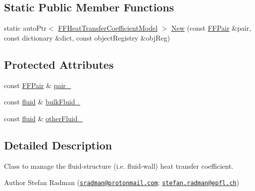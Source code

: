 \subsection*{Static Public Member Functions}
\begin{DoxyCompactItemize}
\item 
static auto\+Ptr$<$ \hyperlink{classFoam_1_1FFHeatTransferCoefficientModel}{F\+F\+Heat\+Transfer\+Coefficient\+Model} $>$ \hyperlink{classFoam_1_1FFHeatTransferCoefficientModel_ac917369d96e721a596cc42707f50dd0a}{New} (const \hyperlink{classFoam_1_1FFPair}{F\+F\+Pair} \&pair, const dictionary \&dict, const object\+Registry \&obj\+Reg)
\end{DoxyCompactItemize}
\subsection*{Protected Attributes}
\begin{DoxyCompactItemize}
\item 
const \hyperlink{classFoam_1_1FFPair}{F\+F\+Pair} \& \hyperlink{classFoam_1_1FFHeatTransferCoefficientModel_ad015e769561f394d7c717d4356dcded4}{pair\+\_\+}
\item 
const \hyperlink{classFoam_1_1fluid}{fluid} \& \hyperlink{classFoam_1_1FFHeatTransferCoefficientModel_ad853ff86690af01e2831fc8ecad45933}{bulk\+Fluid\+\_\+}
\item 
const \hyperlink{classFoam_1_1fluid}{fluid} \& \hyperlink{classFoam_1_1FFHeatTransferCoefficientModel_a8c5ad90c0cd1c97dfe58525a288d0f47}{other\+Fluid\+\_\+}
\end{DoxyCompactItemize}


\subsection{Detailed Description}
Class to manage the fluid-\/structure (i.\+e. fluid-\/wall) heat transfer coefficient. 

\label{_Description}%
 Author Stefan Radman (\href{mailto:sradman@protonmail.com}{\tt sradman@protonmail.\+com}; \href{mailto:stefan.radman@epfl.ch}{\tt stefan.\+radman@epfl.\+ch})

